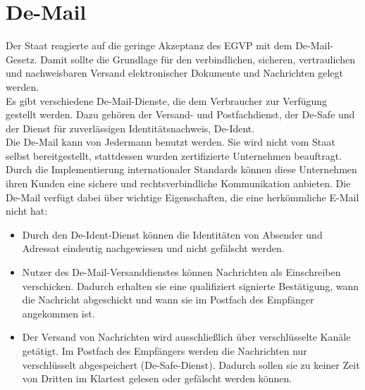 \section{De-Mail}
Der Staat reagierte auf die geringe Akzeptanz des EGVP mit dem De-Mail-Gesetz. Damit sollte die Grundlage für den verbindlichen, sicheren, vertraulichen und nachweisbaren Versand elektronischer Dokumente und Nachrichten gelegt werden.\textcite{bea:demail} \\
Es gibt verschiedene De-Mail-Dienste, die dem Verbraucher zur Verfügung gestellt werden. Dazu gehören der Versand- und Postfachdienst, der De-Safe und der Dienst für zuverlässigen Identitätsnachweis, De-Ident. \\
Die De-Mail kann von Jedermann benutzt werden. Sie wird nicht vom Staat selbst bereitgestellt, stattdessen wurden zertifizierte Unternehmen beauftragt. Durch die Implementierung internationaler Standards können diese Unternehmen ihren Kunden eine sichere und rechtsverbindliche Kommunikation anbieten. Die De-Mail verfügt dabei über wichtige Eigenschaften, die eine herkömmliche E-Mail nicht hat:
\begin{itemize}
	\item Durch den De-Ident-Dienst können die Identitäten von Absender und Adressat eindeutig nachgewiesen und nicht gefälscht werden. 
	\item Nutzer des De-Mail-Versanddienstes können Nachrichten als Einschreiben verschicken. Dadurch erhalten sie eine qualifiziert signierte Bestätigung, wann die Nachricht abgeschickt und wann sie im Postfach des Empfänger angekommen ist.
	\item Der Versand von Nachrichten wird ausschließlich über verschlüsselte Kanäle getätigt. Im Postfach des Empfängers werden die Nachrichten nur verschlüsselt abgespeichert (De-Safe-Dienst). Dadurch sollen sie zu keiner Zeit von Dritten im Klartest gelesen oder gefälscht werden können.
\end{itemize}

